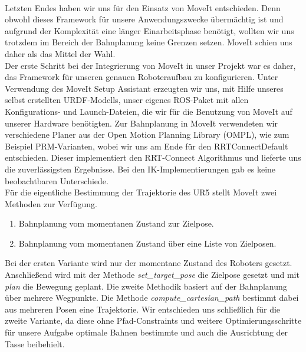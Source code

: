 \newline \\
Letzten Endes haben wir uns für den Einsatz von MoveIt entschieden. Denn obwohl dieses Framework für unsere Anwendungszwecke übermächtig ist und aufgrund der Komplexität eine länger Einarbeitsphase benötigt, wollten wir uns trotzdem im Bereich der Bahnplanung keine Grenzen setzen. MoveIt schien uns daher als das Mittel der Wahl.
\newline \\
Der erste Schritt bei der Integrierung von MoveIt in unser Projekt war es daher, das Framework für unseren genauen Roboteraufbau zu konfigurieren. Unter Verwendung des MoveIt Setup Assistant \cite{MoveItAssistant} erzeugten wir uns, mit Hilfe unseres selbst erstellten URDF-Modells, unser eigenes ROS-Paket mit allen Konfigurations- und Launch-Dateien, die wir für die Benutzung von MoveIt auf unserer Hardware benötigten.
\newline
Zur Bahnplanung in MoveIt verwendeten wir verschiedene Planer aus der Open Motion Planning Library (OMPL), wie zum Beispiel PRM-Varianten, wobei wir uns am Ende für den RRTConnectDefault entschieden. Dieser implementiert den RRT-Connect Algorithmus und lieferte uns die zuverlässigsten Ergebnisse. Bei den IK-Implementierungen gab es keine beobachtbaren Unterschiede.
\newline \\
Für die eigentliche Bestimmung der Trajektorie des UR5 stellt MoveIt zwei Methoden zur Verfügung.
\begin{enumerate}
	\item Bahnplanung vom momentanen Zustand zur Zielpose.
	\item Bahnplanung vom momentanen Zustand über eine Liste von Zielposen.
\end{enumerate}
Bei der ersten Variante wird nur der momentane Zustand des Roboters gesetzt. Anschließend wird mit der Methode \textit{set\_target\_pose} die Zielpose gesetzt und mit \textit{plan} die Bewegung geplant. Die zweite Methodik basiert auf der Bahnplanung über mehrere Wegpunkte. Die Methode \textit{compute\_cartesian\_path} bestimmt dabei aus mehreren Posen eine Trajektorie. Wir entschieden uns schließlich für die zweite Variante, da diese ohne Pfad-Constraints und weitere Optimierungsschritte für unsere Aufgabe optimale Bahnen bestimmte und auch die Ausrichtung der Tasse beibehielt.
